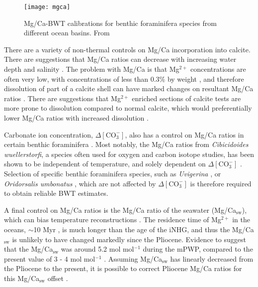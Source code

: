 \begin{figure}[h]
	\texttt{[image: mgca]}
	\centering
	\caption{Mg/Ca-BWT calibrations for benthic foraminifera species from different ocean basins. From \citet{elderfieldCalibrationsBenthicForaminiferal2006}}
	\label{fig:mgca}
\end{figure}

There are a variety of non-thermal controls on Mg/Ca incorporation into calcite. There are suggestions that Mg/Ca ratios can decrease with increasing water depth \citep{lea14ElementalIsotopic2014} and salinity \citep{dissardImpactSalinityMg2010}. The problem with Mg/Ca is that Mg$^{2+}$ concentrations are often very low, with concentrations of less than 0.3\% by weight \citep{emilianiMineralogicalChemicalComposition1955}, and therefore dissolution of part of a calcite shell can have marked changes on resultant Mg/Ca ratios \citep{barkerStudyCleaningProcedures2003}. There are suggestions that Mg$^{2+}$ enriched sections of calcite tests are more prone to dissolution compared to normal calcite, which would preferentially lower Mg/Ca ratios with increased dissolution \citep{brownVariationsMgCa1996}. 

Carbonate ion concentration, $\Delta\left[ \text{CO}_{3}^{-} \right]$, also has a control on Mg/Ca ratios in certain benthic foraminifera \citep{rosenthalTemperatureCarbonateIon2006}. Most notably, the Mg/Ca ratios from \emph{Cibicidoides wuellerstorfi}, a species often used for oxygen and carbon isotope studies, has been shown to be independent of temperature, and solely dependent on $\Delta\left[ \text{CO}_{3}^{-} \right]$ \citep{yuMgCaBenthic2008}. Selection of specific benthic foraminifera species, such as \emph{Uvigerina} \citep{elderfieldCalibrationsBenthicForaminiferal2006}, or \emph{Oridorsalis umbonatus} \citep{learNeogeneIceVolume2015}, which are not affected by $\Delta\left[ \text{CO}_{3}^{-} \right]$ is therefore required to obtain reliable BWT estimates.

A final control on Mg/Ca ratios is the Mg/Ca ratio of the seawater (Mg/Ca$_\text{sw}$), which can bias temperature reconstructions \citep{lea14ElementalIsotopic2014}. The residence time of Mg$^{2+}$ in the oceans, $\sim$10 Myr \citep{hemStudyInterpretationChemical1985}, is much longer than the age of the iNHG, and thus the Mg/Ca$_\text{sw}$ is unlikely to have changed markedly since the Pliocene. Evidence to suggest that the Mg/Ca$_\text{sw}$ was around 5.2 mol mol$^{-1}$ during the mPWP, compared to the present value of 3 - 4 mol mol$^{-1}$ \citep{evansPlankticForaminiferaShell2016}. Assuming Mg/Ca$_\text{sw}$ has linearly decreased from the Pliocene to the present, it is possible to correct Pliocene Mg/Ca ratios for this Mg/Ca$_\text{sw}$ offset \citep{evansPlankticForaminiferaShell2016, jakobNewSealevelRecord2020}.

